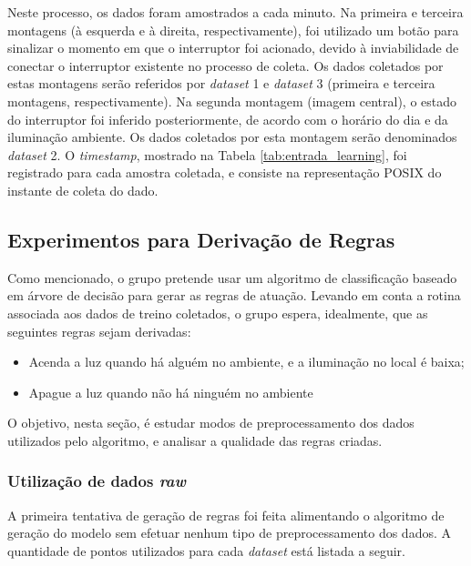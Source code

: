 Neste processo, os dados foram amostrados a cada minuto. Na primeira e terceira montagens (à esquerda e à direita, respectivamente), foi utilizado um botão para sinalizar o momento em que o interruptor foi acionado, devido à inviabilidade de conectar o interruptor existente no processo de coleta. Os dados coletados por estas montagens serão referidos por \textit{dataset} 1 e \textit{dataset} 3 (primeira e terceira montagens, respectivamente). Na segunda montagem (imagem central), o estado do interruptor foi inferido posteriormente, de acordo com o horário do dia e da iluminação ambiente. Os dados coletados por esta montagem serão denominados \textit{dataset} 2. O \textit{timestamp}, mostrado na Tabela \ref{tab:entrada_learning}, foi registrado para cada amostra coletada, e consiste na representação POSIX do instante de coleta do dado.

\subsection{Experimentos para Derivação de Regras} \label{subsubsec:exp_regras}
Como mencionado, o grupo pretende usar um algoritmo de classificação baseado em árvore de decisão para gerar as regras de atuação. Levando em conta a rotina associada aos dados de treino coletados, o grupo espera, idealmente, que as seguintes regras sejam derivadas:
\begin{itemize}
	\item Acenda a luz quando há alguém no ambiente, e a iluminação no local é baixa;
	\item Apague a luz quando não há ninguém no ambiente
\end{itemize}

O objetivo, nesta seção, é estudar modos de preprocessamento dos dados utilizados pelo algoritmo, e analisar a qualidade das regras criadas.

\subsubsection{Utilização de dados \textit{raw}}
A primeira tentativa de geração de regras foi feita alimentando o algoritmo de geração do modelo sem efetuar nenhum tipo de preprocessamento dos dados. A quantidade de pontos utilizados para cada \textit{dataset} está listada a seguir.

